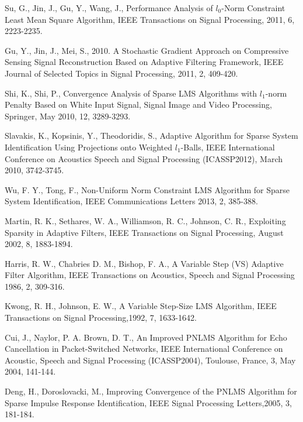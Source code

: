 Su, G., Jin, J., Gu, Y., Wang, J., Performance Analysis of $l_0$-Norm Constraint Least  Mean Square Algorithm, IEEE Transactions on Signal Processing, 2011, 6, 2223-2235.

Gu, Y., Jin, J., Mei, S., 2010. A Stochastic Gradient Approach on Compressive Sensing Signal Reconstruction Based on Adaptive Filtering Framework, IEEE Journal of Selected Topics in Signal Processing, 2011, 2, 409-420.

Shi, K., Shi, P., Convergence Analysis of Sparse LMS Algorithms with $l_1$-norm Penalty Based on White Input Signal, Signal Image and Video Processing, Springer, May 2010, 12, 3289-3293.

Slavakis, K., Kopsinis, Y., Theodoridis, S., Adaptive Algorithm for Sparse System Identification Using Projections onto Weighted $l_1$-Balls, IEEE International Conference on Acoustics Speech and Signal Processing (ICASSP2012), March 2010, 3742-3745.


Wu, F. Y., Tong, F., Non-Uniform Norm Constraint LMS Algorithm for Sparse System Identification, IEEE Communications Letters 2013, 2, 385-388.

%
Martin, R. K., Sethares, W. A., Williamson, R. C., Johnson, C. R., Exploiting Sparsity in Adaptive Filters, IEEE Transactions on Signal Processing, August 2002, 8, 1883-1894.



Harris, R. W., Chabries  D. M., Bishop, F. A., A Variable Step (VS) Adaptive Filter Algorithm, IEEE Transactions on Acoustics, Speech and Signal Processing 1986, 2, 309-316.




Kwong, R. H., Johnson, E. W., A Variable Step-Size LMS Algorithm,  IEEE Transactions on Signal Processing,1992, 7, 1633-1642.


Cui, J., Naylor, P. A. Brown, D. T., An Improved PNLMS Algorithm for Echo Cancellation in Packet-Switched Networks, IEEE International Conference on  Acoustic, Speech and Signal Processing (ICASSP2004), Toulouse, France, 3, May 2004, 141-144.

Deng, H., Doroslovacki, M., Improving Convergence of the PNLMS Algorithm for Sparse Impulse Response Identiﬁcation, IEEE Signal Processing Letters,2005, 3, 181-184.

